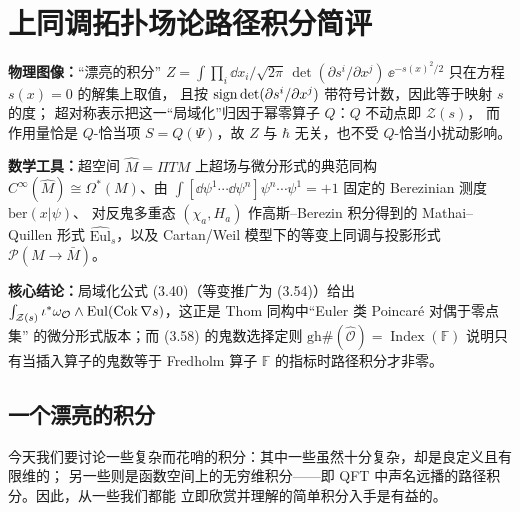 
\section{上同调拓扑场论路径积分简评}

\begin{keytakeaways}
\item \textbf{物理图像：}“漂亮的积分” $Z=\int\prod_i \dd x_i/\sqrt{2\pi}\,
  \det(\partial s^i/\partial x^j)\,\ee^{-s(x)^2/2}$ 只在方程 $s(x)=0$ 的解集上取值，
  且按 $\operatorname{sign}\det(\partial s^i/\partial x^j)$ 带符号计数，因此等于映射 $s$ 的度；
  超对称表示把这一“局域化”归因于幂零算子 $Q$：$Q$ 不动点即 $\mathcal Z(s)$，
  而作用量恰是 $Q$-恰当项 $S=Q(\Psi)$，故 $Z$ 与 $\hbar$ 无关，也不受 $Q$-恰当小扰动影响。
\item \textbf{数学工具：}超空间 $\widehat M=\Pi TM$ 上超场与微分形式的典范同构
  $C^{\infty}(\widehat M)\cong\Omega^{\ast}(M)$、由 $\int[\dd\psi^1\cdots\dd\psi^n]
  \psi^n\cdots\psi^1=+1$ 固定的 Berezinian 测度 $\mathrm{ber}(x|\psi)$、
  对反鬼多重态 $(\chi_a,H_a)$ 作高斯–Berezin 积分得到的 Mathai--Quillen 形式
  $\widehat{\mathrm{Eul}}_s$，以及 Cartan/Weil 模型下的等变上同调与投影形式
  $\mathcal P(M\to\bar M)$。
\item \textbf{核心结论：}局域化公式 (3.40)（等变推广为 (3.54)）给出
  $\int_{\mathcal Z(s)}\iota^{\ast}\omega_{\mathcal O}\wedge
  \mathrm{Eul}(\operatorname{Cok}\nabla s)$，这正是 Thom 同构中“Euler 类 Poincar\'e 对偶于零点集”
  的微分形式版本；而 (3.58) 的鬼数选择定则
  $\mathrm{gh}\#(\widehat{\mathcal O})=\operatorname{Index}(\mathbb F)$
  说明只有当插入算子的鬼数等于 Fredholm 算子 $\mathbb F$ 的指标时路径积分才非零。
\end{keytakeaways}

\subsection{一个漂亮的积分}

今天我们要讨论一些复杂而花哨的积分：其中一些虽然十分复杂，却是良定义且有限维的；
另一些则是函数空间上的无穷维积分——即 QFT 中声名远播的路径积分。因此，从一些我们都能
立即欣赏并理解的简单积分入手是有益的。

